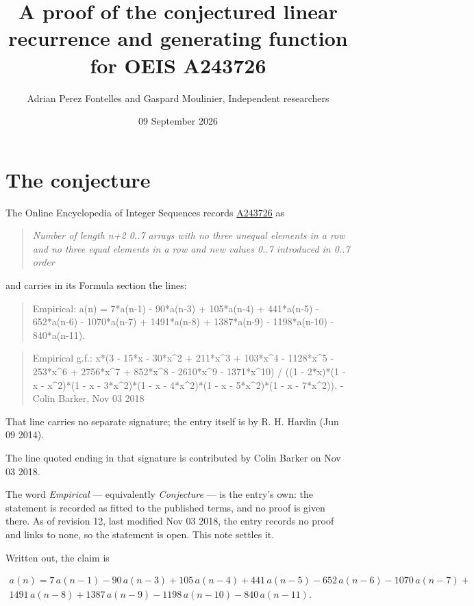 \documentclass[11pt]{article}
\title{A proof of the conjectured linear recurrence and generating function for OEIS A243726}
\author{Adrian Perez Fontelles and Gaspard Moulinier, Independent researchers}
\date{09 September 2026}
\theoremstyle{definition}
\begin{document}
\maketitle
\section{The conjecture}

The Online Encyclopedia of Integer Sequences records \href{https://oeis.org/A243726}{A243726} as

\begin{quote}\itshape Number of length n+2 0..7 arrays with no three unequal elements in a row and no three equal elements in a row and new values 0..7 introduced in 0..7 order\end{quote}

and carries in its Formula section the lines:

\begin{quote}\ttfamily Empirical: a(n) = 7*a(n-1) - 90*a(n-3) + 105*a(n-4) + 441*a(n-5) - 652*a(n-6) - 1070*a(n-7) + 1491*a(n-8) + 1387*a(n-9) - 1198*a(n-10) - 840*a(n-11).\end{quote}

\begin{quote}\ttfamily Empirical g.f.: x*(3 - 15*x - 30*x\textasciicircum{}2 + 211*x\textasciicircum{}3 + 103*x\textasciicircum{}4 - 1128*x\textasciicircum{}5 - 253*x\textasciicircum{}6 + 2756*x\textasciicircum{}7 + 852*x\textasciicircum{}8 - 2610*x\textasciicircum{}9 - 1371*x\textasciicircum{}10) / ((1 - 2*x)*(1 - x - x\textasciicircum{}2)*(1 - x - 3*x\textasciicircum{}2)*(1 - x - 4*x\textasciicircum{}2)*(1 - x - 5*x\textasciicircum{}2)*(1 - x - 7*x\textasciicircum{}2)). - Colin Barker, Nov 03 2018\end{quote}

That line carries no separate signature; the entry itself is by R. H. Hardin (Jun 09 2014).

The line quoted ending in that signature is contributed by Colin Barker on Nov 03 2018.

The word {\itshape Empirical} --- equivalently {\itshape Conjecture} --- is the entry's own: the statement is recorded as fitted to the published terms, and no proof is given there. As of revision 12, last modified Nov 03 2018, the entry records no proof and links to none, so the statement is open. This note settles it.

Written out, the claim is

\begin{multline*} a(n) = 7\,a(n-1) - 90\,a(n-3) + 105\,a(n-4) + 441\,a(n-5) - 652\,a(n-6) - 1070\,a(n-7) + \\ 1491\,a(n-8) + 1387\,a(n-9) - 1198\,a(n-10) - 840\,a(n-11). \end{multline*}
\end{document}
